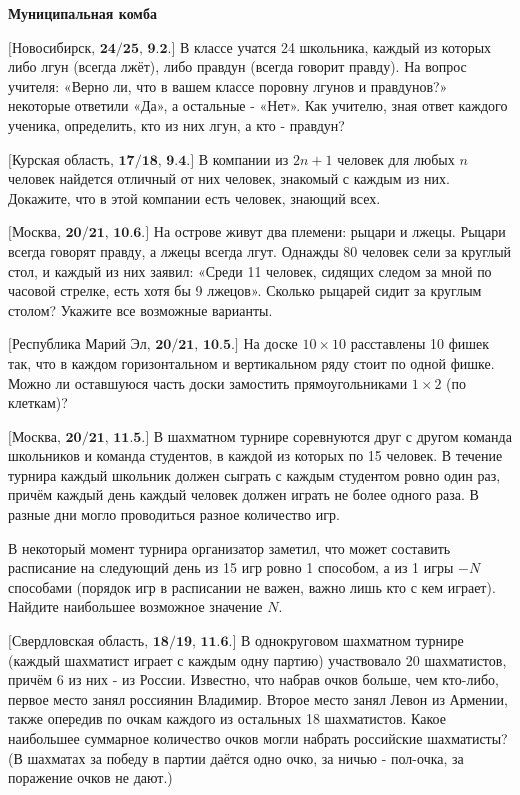 \centerline{\bf \Huge Муниципальная комба}

$\bigl[\textbf{Новосибирск, 24/25, 9.2.}\bigr]$
В классе учатся 24 школьника, каждый из которых либо лгун (всегда лжёт), либо правдун (всегда говорит правду). На вопрос учителя: «Верно ли, что в вашем классе поровну лгунов и правдунов?» некоторые ответили «Да», а остальные - «Нет». Как учителю, зная ответ каждого ученика, определить, кто из них лгун, а кто - правдун?


$\bigl[\textbf{Курская область, 17/18, 9.4.}\bigr]$
В компании из $2 n+1$ человек для любых $n$ человек найдется отличный от них человек, знакомый с каждым из них. Докажите, что в этой компании есть человек, знающий всех.

$\bigl[\textbf{Москва, 20/21, 10.6.}\bigr]$
На острове живут два племени: рыцари и лжецы. Рыцари всегда говорят правду, а лжецы всегда лгут. Однажды 80 человек сели за круглый стол, и каждый из них заявил: «Среди 11 человек, сидящих следом за мной по часовой стрелке, есть хотя бы 9 лжецов». Сколько рыцарей сидит за круглым столом? Укажите все возможные варианты.

$\bigl[\textbf{Республика Марий Эл, 20/21, 10.5.}\bigr]$
На доске $10 \times 10$ расставлены 10 фишек так, что в каждом горизонтальном и вертикальном ряду стоит по одной фишке. Можно ли оставшуюся часть доски замостить прямоугольниками $1 \times 2$ (по клеткам)?


$\bigl[\textbf{Москва, 20/21, 11.5.}\bigr]$
В шахматном турнире соревнуются друг с другом команда школьников и команда студентов, в каждой из которых по 15 человек. В течение турнира каждый школьник должен сыграть с каждым студентом ровно один раз, причём каждый день каждый человек должен играть не более одного раза. В разные дни могло проводиться разное количество игр.

В некоторый момент турнира организатор заметил, что может составить расписание на следующий день из 15 игр ровно 1 способом, а из 1 игры $-N$ способами (порядок игр в расписании не важен, важно лишь кто с кем играет). Найдите наибольшее возможное значение $N$.

\newpage

\hspace{3mm}

$\bigl[\textbf{Свердловская область, 18/19, 11.6.}\bigr]$
В однокруговом шахматном турнире (каждый шахматист играет с каждым одну партию) участвовало 20 шахматистов, причём 6 из них - из России. Известно, что набрав очков больше, чем кто-либо, первое место занял россиянин Владимир. Второе место занял Левон из Армении, также опередив по очкам каждого из остальных 18 шахматистов. Какое наибольшее суммарное количество очков могли набрать российские шахматисты? (В шахматах за победу в партии даётся одно очко, за ничью - пол-очка, за поражение очков не дают.)